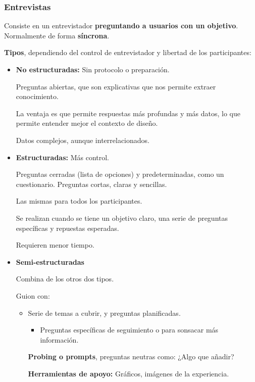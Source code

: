\documentclass[12pt]{report} %
\begin{document}
\hypertarget{entrevistas}{%
\subsubsection{Entrevistas}\label{entrevistas}}

Consiste en un entrevistador \textbf{preguntando a usuarios con un
objetivo}. Normalmente de forma \textbf{síncrona}.

\textbf{Tipos}, dependiendo del control de entrevistador y libertad de
los participantes:

\begin{itemize}
\item
  \textbf{No estructuradas:} Sin protocolo o preparación.

  Preguntas abiertas, que son explicativas que nos permite extraer
  conocimiento.

  La ventaja es que permite respuestas más profundas y más datos, lo que
  permite entender mejor el contexto de diseño.

  Datos complejos, aunque interrelacionados.
\item
  \textbf{Estructuradas:} Más control.

  Preguntas cerradas (lista de opciones) y predeterminadas, como un
  cuestionario. Preguntas cortas, claras y sencillas.

  Las mismas para todos los participantes.

  Se realizan cuando se tiene un objetivo claro, una serie de preguntas
  específicas y repuestas esperadas.

  Requieren menor tiempo.
\item
  \textbf{Semi-estructuradas}

  Combina de los otros dos tipos.

  Guion con:

  \begin{itemize}
  \item
    Serie de temas a cubrir, y preguntas planificadas.

    \begin{itemize}
    
    \item
      Preguntas específicas de seguimiento o para sonsacar más
      información.
    \end{itemize}

    \textbf{Probing o prompts}, preguntas neutras como: ¿Algo que
    añadir?

    \textbf{Herramientas de apoyo:} Gráficos, imágenes de la
    experiencia.
  \end{itemize}
\end{itemize}
\end{document}
